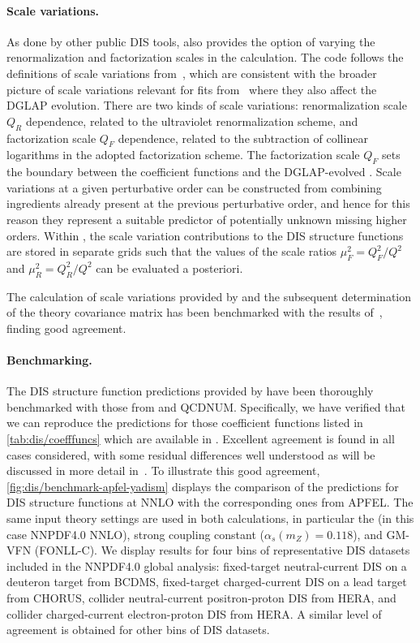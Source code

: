 \paragraph{Scale variations.}
%
As done by other public DIS tools, \yadism also provides the option of varying
the renormalization and factorization scales in the calculation.
%
The code follows the definitions of scale variations
from~\cite{vanNeerven:2000uj,vanNeerven:2001pe}, which are consistent with the
broader picture of scale variations relevant for \pdf{} fits
from~\cite{NNPDF:2019ubu} where they also affect the DGLAP evolution.
%
There are two kinds of scale variations: renormalization scale $Q_R$
dependence, related to the ultraviolet renormalization scheme, and
factorization scale $Q_F$ dependence, related to the subtraction of collinear
logarithms in the adopted factorization scheme.
%
The factorization scale $Q_F$ sets  the boundary between the coefficient
functions and the DGLAP-evolved \pdfs.
%
Scale variations at a given perturbative order can be constructed from
combining ingredients already present at the previous perturbative order, and
hence for this reason they represent a suitable predictor of potentially
unknown missing higher orders.
%
Within \yadism, the scale variation contributions to the DIS structure
functions are stored in separate grids such that the values of the scale ratios
$\mu_F^2=Q_F^2/Q^2$ and $\mu_R^2=Q_R^2/Q^2$ can be evaluated a posteriori.

The calculation of scale variations provided by \yadism and the subsequent
determination of the \mhou theory covariance matrix has been benchmarked with
the results of~\cite{NNPDF:2019ubu}, finding good agreement.

\paragraph{Benchmarking.}
%
The DIS structure function predictions provided by \yadism have been thoroughly
benchmarked  with those from \apfel and \textsc{\small QCDNUM}.
%
Specifically, we have verified that we can reproduce the \apfel predictions for
those coefficient functions listed in \cref{tab:dis/coefffuncs} which are
available in \apfel.
%
Excellent agreement is found in all cases considered, with some residual
differences well understood as will be discussed in more detail
in~\cite{yadism}.
%
To illustrate this good agreement, \cref{fig:dis/benchmark-apfel-yadism}
displays the comparison of the \yadism predictions for DIS
structure functions at NNLO with the corresponding ones from \textsc{\small
APFEL}.
%
The same input theory settings are used in both calculations, in particular the
\pdfs (in this case NNPDF4.0 NNLO), strong coupling constant
($\alpha_s(m_Z)=0.118$), and GM-VFN (FONLL-C).
%
We display results for four bins of representative DIS datasets included in the
NNPDF4.0 global analysis: fixed-target neutral-current DIS on a deuteron target
from BCDMS, fixed-target charged-current DIS on a lead target from CHORUS,
collider neutral-current positron-proton DIS from HERA, and collider
charged-current electron-proton DIS from HERA.
%
A similar level of agreement is obtained for other bins of DIS datasets.

